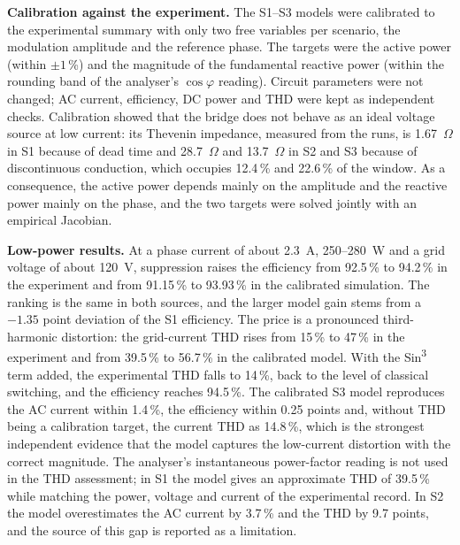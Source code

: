 \textbf{Calibration against the experiment.} The S1--S3 models were calibrated to the experimental summary with only two free variables per scenario, the modulation amplitude and the reference phase. The targets were the active power (within $\pm1$\,\%) and the magnitude of the fundamental reactive power (within the rounding band of the analyser's $\cos\varphi$ reading). Circuit parameters were not changed; AC current, efficiency, DC power and THD were kept as independent checks. Calibration showed that the bridge does not behave as an ideal voltage source at low current: its Thevenin impedance, measured from the runs, is 1.67~$\Omega$ in S1 because of dead time and 28.7~$\Omega$ and 13.7~$\Omega$ in S2 and S3 because of discontinuous conduction, which occupies 12.4\,\% and 22.6\,\% of the window. As a consequence, the active power depends mainly on the amplitude and the reactive power mainly on the phase, and the two targets were solved jointly with an empirical Jacobian.

\textbf{Low-power results.} At a phase current of about 2.3~A, 250--280~W and a grid voltage of about 120~V, suppression raises the efficiency from 92.5\,\% to 94.2\,\% in the experiment and from 91.15\,\% to 93.93\,\% in the calibrated simulation. The ranking is the same in both sources, and the larger model gain stems from a $-1.35$ point deviation of the S1 efficiency. The price is a pronounced third-harmonic distortion: the grid-current THD rises from 15\,\% to 47\,\% in the experiment and from 39.5\,\% to 56.7\,\% in the calibrated model. With the Sin\textsuperscript{3} term added, the experimental THD falls to 14\,\%, back to the level of classical switching, and the efficiency reaches 94.5\,\%. The calibrated S3 model reproduces the AC current within 1.4\,\%, the efficiency within 0.25 points and, without THD being a calibration target, the current THD as 14.8\,\%, which is the strongest independent evidence that the model captures the low-current distortion with the correct magnitude. The analyser's instantaneous power-factor reading is not used in the THD assessment; in S1 the model gives an approximate THD of 39.5\,\% while matching the power, voltage and current of the experimental record. In S2 the model overestimates the AC current by 3.7\,\% and the THD by 9.7 points, and the source of this gap is reported as a limitation.

